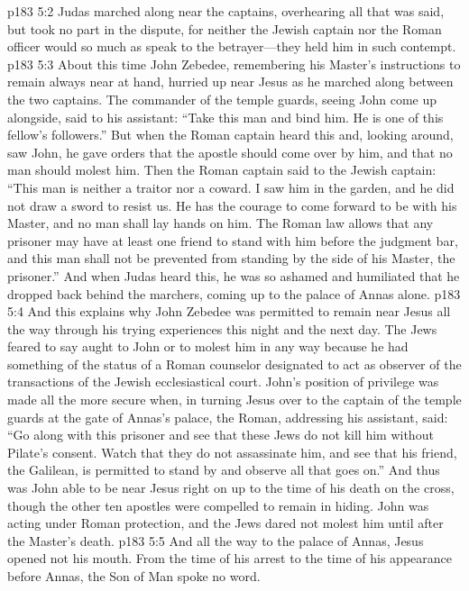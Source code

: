 \vs p183 5:2 Judas marched along near the captains, overhearing all that was said, but took no part in the dispute, for neither the Jewish captain nor the Roman officer would so much as speak to the betrayer---they held him in such contempt.
\vs p183 5:3 About this time John Zebedee, remembering his Master’s instructions to remain always near at hand, hurried up near Jesus as he marched along between the two captains. The commander of the temple guards, seeing John come up alongside, said to his assistant: “Take this man and bind him. He is one of this fellow’s followers.” But when the Roman captain heard this and, looking around, saw John, he gave orders that the apostle should come over by him, and that no man should molest him. Then the Roman captain said to the Jewish captain: “This man is neither a traitor nor a coward. I saw him in the garden, and he did not draw a sword to resist us. He has the courage to come forward to be with his Master, and no man shall lay hands on him. The Roman law allows that any prisoner may have at least one friend to stand with him before the judgment bar, and this man shall not be prevented from standing by the side of his Master, the prisoner.” And when Judas heard this, he was so ashamed and humiliated that he dropped back behind the marchers, coming up to the palace of Annas alone.
\vs p183 5:4 And this explains why John Zebedee was permitted to remain near Jesus all the way through his trying experiences this night and the next day. The Jews feared to say aught to John or to molest him in any way because he had something of the status of a Roman counselor designated to act as observer of the transactions of the Jewish ecclesiastical court. John’s position of privilege was made all the more secure when, in turning Jesus over to the captain of the temple guards at the gate of Annas’s palace, the Roman, addressing his assistant, said: “Go along with this prisoner and see that these Jews do not kill him without Pilate’s consent. Watch that they do not assassinate him, and see that his friend, the Galilean, is permitted to stand by and observe all that goes on.” And thus was John able to be near Jesus right on up to the time of his death on the cross, though the other ten apostles were compelled to remain in hiding. John was acting under Roman protection, and the Jews dared not molest him until after the Master’s death.
\vs p183 5:5 And all the way to the palace of Annas, Jesus opened not his mouth. From the time of his arrest to the time of his appearance before Annas, the Son of Man spoke no word.
